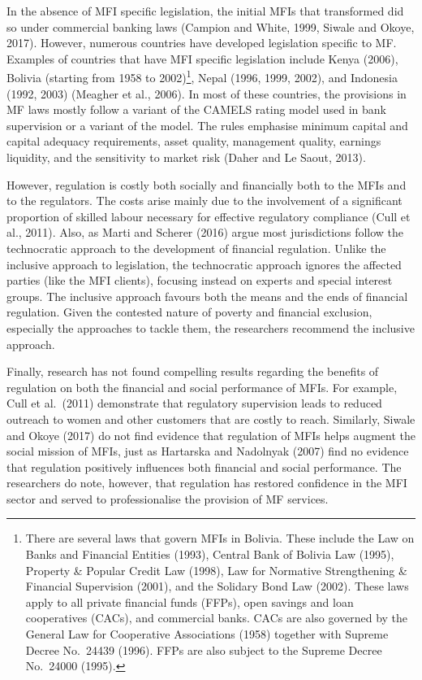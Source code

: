 \documentclass[a4paper, nobind]{templates/ociamthesis}
\begin{document}
In the absence of MFI specific legislation, the initial MFIs that transformed did so under commercial banking laws (Campion and White, 1999, Siwale and Okoye, 2017). However, numerous countries have developed legislation specific to MF. Examples of countries that have MFI specific legislation include Kenya (2006), Bolivia (starting from 1958 to 2002)\footnote{There are several laws that govern MFIs in Bolivia. These include the Law on Banks and Financial Entities (1993), Central Bank of Bolivia Law (1995), Property \& Popular Credit Law (1998), Law for Normative Strengthening \& Financial Supervision (2001), and the Solidary Bond Law (2002). These laws apply to all private financial funds (FFPs), open savings and loan cooperatives (CACs), and commercial banks. CACs are also governed by the General Law for Cooperative Associations (1958) together with Supreme Decree No.~24439 (1996). FFPs are also subject to the Supreme Decree No.~24000 (1995).}, Nepal (1996, 1999, 2002), and Indonesia (1992, 2003) (Meagher et al., 2006). In most of these countries, the provisions in MF laws mostly follow a variant of the CAMELS rating model used in bank supervision or a variant of the model. The rules emphasise minimum capital and capital adequacy requirements, asset quality, management quality, earnings liquidity, and the sensitivity to market risk (Daher and Le Saout, 2013).

However, regulation is costly both socially and financially both to the MFIs and to the regulators. The costs arise mainly due to the involvement of a significant proportion of skilled labour necessary for effective regulatory compliance (Cull et al., 2011). Also, as Marti and Scherer (2016) argue most jurisdictions follow the technocratic approach to the development of financial regulation. Unlike the inclusive approach to legislation, the technocratic approach ignores the affected parties (like the MFI clients), focusing instead on experts and special interest groups. The inclusive approach favours both the means and the ends of financial regulation. Given the contested nature of poverty and financial exclusion, especially the approaches to tackle them, the researchers recommend the inclusive approach.

Finally, research has not found compelling results regarding the benefits of regulation on both the financial and social performance of MFIs. For example, Cull et al.~(2011) demonstrate that regulatory supervision leads to reduced outreach to women and other customers that are costly to reach. Similarly, Siwale and Okoye (2017) do not find evidence that regulation of MFIs helps augment the social mission of MFIs, just as Hartarska and Nadolnyak (2007) find no evidence that regulation positively influences both financial and social performance. The researchers do note, however, that regulation has restored confidence in the MFI sector and served to professionalise the provision of MF services.
\end{document}
